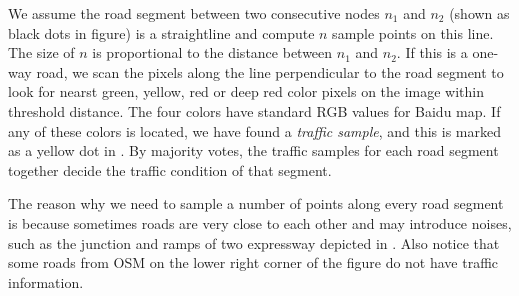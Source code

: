 We assume the road segment between two consecutive nodes $n_1$ and $n_2$ 
(shown as black dots in figure)
is a straightline and compute $n$ sample points on this line. 
The size of $n$ is proportional to the distance between  $n_1$ and
$n_2$. If this is a one-way road, we scan the pixels along the line
perpendicular to the road segment to look for nearst green, 
yellow, red or deep red color pixels
on the image within threshold distance. The four colors have standard
RGB values for Baidu map. If any of these colors is located, we have
found a {\em traffic sample}, and this is marked as a yellow dot
in . By majority votes, the traffic samples for 
each road segment together decide the traffic condition of that segment.

The reason why we need to sample a number of points along every road 
segment is because sometimes roads are very close to each other 
and may introduce noises, such as the junction and ramps of 
two expressway depicted in . Also notice that
some roads from OSM on the lower right corner of the figure
do not have traffic information.

%
%
%
%
%

